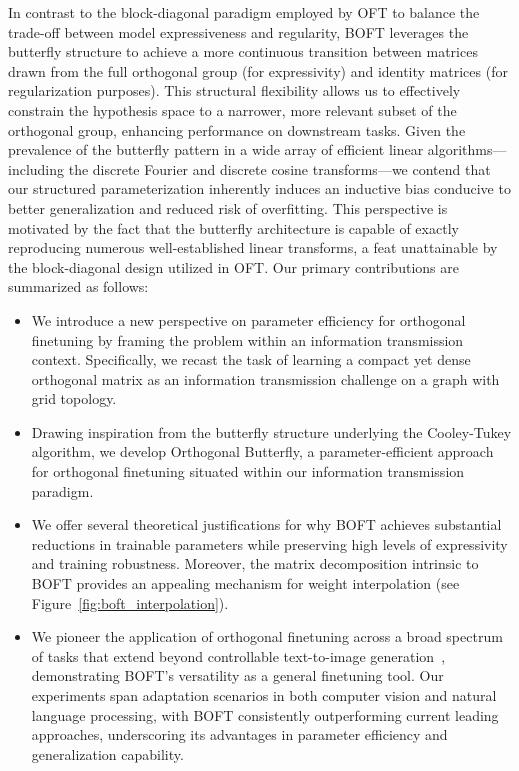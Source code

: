 In contrast to the block-diagonal paradigm employed by OFT to balance the trade-off between model expressiveness and regularity, BOFT leverages the butterfly structure to achieve a more continuous transition between matrices drawn from the full orthogonal group (for expressivity) and identity matrices (for regularization purposes). This structural flexibility allows us to effectively constrain the hypothesis space to a narrower, more relevant subset of the orthogonal group, enhancing performance on downstream tasks. Given the prevalence of the butterfly pattern in a wide array of efficient linear algorithms—including the discrete Fourier and discrete cosine transforms—we contend that our structured parameterization inherently induces an inductive bias conducive to better generalization and reduced risk of overfitting. This perspective is motivated by the fact that the butterfly architecture is capable of exactly reproducing numerous well-established linear transforms, a feat unattainable by the block-diagonal design utilized in OFT. Our primary contributions are summarized as follows:

\begin{itemize}[leftmargin=*,nosep]
    \item We introduce a new perspective on parameter efficiency for orthogonal finetuning by framing the problem within an information transmission context. Specifically, we recast the task of learning a compact yet dense orthogonal matrix as an information transmission challenge on a graph with grid topology.
    \item Drawing inspiration from the butterfly structure underlying the Cooley-Tukey algorithm, we develop Orthogonal Butterfly, a parameter-efficient approach for orthogonal finetuning situated within our information transmission paradigm.
    \item We offer several theoretical justifications for why BOFT achieves substantial reductions in trainable parameters while preserving high levels of expressivity and training robustness. Moreover, the matrix decomposition intrinsic to BOFT provides an appealing mechanism for weight interpolation (see Figure~\ref{fig:boft_interpolation}).
    \item We pioneer the application of orthogonal finetuning across a broad spectrum of tasks that extend beyond controllable text-to-image generation~\cite{qiu2023controlling}, demonstrating BOFT’s versatility as a general finetuning tool. Our experiments span adaptation scenarios in both computer vision and natural language processing, with BOFT consistently outperforming current leading approaches, underscoring its advantages in parameter efficiency and generalization capability.
\end{itemize}

